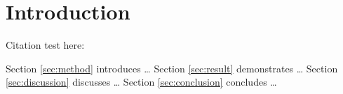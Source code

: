 %   
%   
%   
%   
%   
%   
%   


\section{Introduction}\label{sec:introduction}

Citation test here: \cite{zhang2019exploring}

Section \ref{sec:method} introduces \dots
Section \ref{sec:result} demonstrates \dots
Section \ref{sec:discussion} discusses \dots
Section \ref{sec:conclusion} concludes \dots

